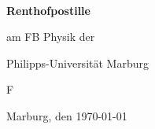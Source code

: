 \begin{titlepage} 

\begin{flushleft}
\mbox{  }
\vspace{3cm}

\centerline{\Huge \bf Renthofpostille}
\vspace{1.5cm}
\centerline{\large am FB Physik der}
\centerline{\large Philipps-Universität Marburg}
\vspace{3cm}
\centerline{
{\mbox{\phifont \hspace*{-2,7cm}F }
\hspace{-12,2cm}}}
\vfill
Marburg, den \today
\end{flushleft} 

\end{titlepage}

\newpage
\thispagestyle{empty}
\newpage
